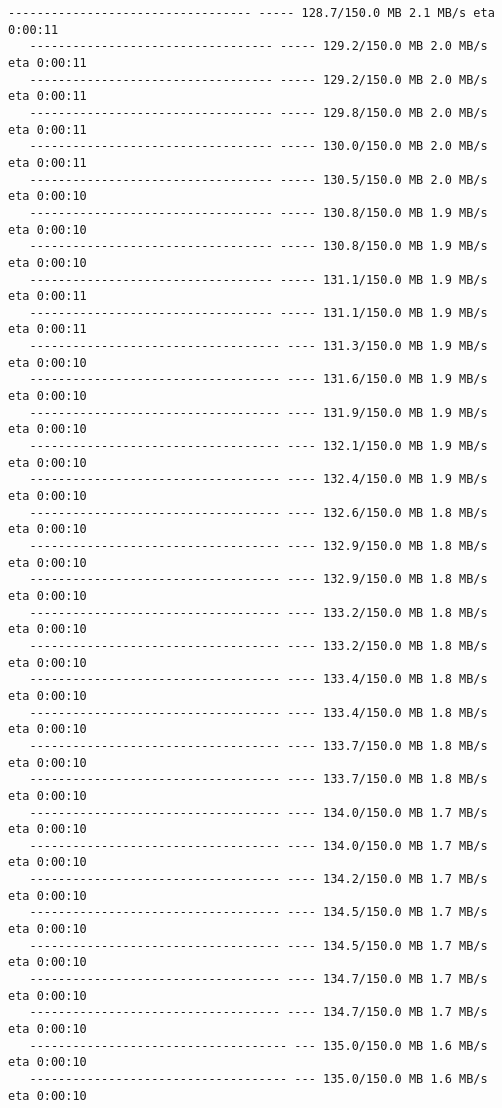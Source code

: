 \documentclass[11pt]{article}
\begin{document}
\begin{Verbatim}[commandchars=\\\{\}]
   ---------------------------------- ----- 128.7/150.0 MB 2.1 MB/s eta 0:00:11
   ---------------------------------- ----- 129.2/150.0 MB 2.0 MB/s eta 0:00:11
   ---------------------------------- ----- 129.2/150.0 MB 2.0 MB/s eta 0:00:11
   ---------------------------------- ----- 129.8/150.0 MB 2.0 MB/s eta 0:00:11
   ---------------------------------- ----- 130.0/150.0 MB 2.0 MB/s eta 0:00:11
   ---------------------------------- ----- 130.5/150.0 MB 2.0 MB/s eta 0:00:10
   ---------------------------------- ----- 130.8/150.0 MB 1.9 MB/s eta 0:00:10
   ---------------------------------- ----- 130.8/150.0 MB 1.9 MB/s eta 0:00:10
   ---------------------------------- ----- 131.1/150.0 MB 1.9 MB/s eta 0:00:11
   ---------------------------------- ----- 131.1/150.0 MB 1.9 MB/s eta 0:00:11
   ----------------------------------- ---- 131.3/150.0 MB 1.9 MB/s eta 0:00:10
   ----------------------------------- ---- 131.6/150.0 MB 1.9 MB/s eta 0:00:10
   ----------------------------------- ---- 131.9/150.0 MB 1.9 MB/s eta 0:00:10
   ----------------------------------- ---- 132.1/150.0 MB 1.9 MB/s eta 0:00:10
   ----------------------------------- ---- 132.4/150.0 MB 1.9 MB/s eta 0:00:10
   ----------------------------------- ---- 132.6/150.0 MB 1.8 MB/s eta 0:00:10
   ----------------------------------- ---- 132.9/150.0 MB 1.8 MB/s eta 0:00:10
   ----------------------------------- ---- 132.9/150.0 MB 1.8 MB/s eta 0:00:10
   ----------------------------------- ---- 133.2/150.0 MB 1.8 MB/s eta 0:00:10
   ----------------------------------- ---- 133.2/150.0 MB 1.8 MB/s eta 0:00:10
   ----------------------------------- ---- 133.4/150.0 MB 1.8 MB/s eta 0:00:10
   ----------------------------------- ---- 133.4/150.0 MB 1.8 MB/s eta 0:00:10
   ----------------------------------- ---- 133.7/150.0 MB 1.8 MB/s eta 0:00:10
   ----------------------------------- ---- 133.7/150.0 MB 1.8 MB/s eta 0:00:10
   ----------------------------------- ---- 134.0/150.0 MB 1.7 MB/s eta 0:00:10
   ----------------------------------- ---- 134.0/150.0 MB 1.7 MB/s eta 0:00:10
   ----------------------------------- ---- 134.2/150.0 MB 1.7 MB/s eta 0:00:10
   ----------------------------------- ---- 134.5/150.0 MB 1.7 MB/s eta 0:00:10
   ----------------------------------- ---- 134.5/150.0 MB 1.7 MB/s eta 0:00:10
   ----------------------------------- ---- 134.7/150.0 MB 1.7 MB/s eta 0:00:10
   ----------------------------------- ---- 134.7/150.0 MB 1.7 MB/s eta 0:00:10
   ------------------------------------ --- 135.0/150.0 MB 1.6 MB/s eta 0:00:10
   ------------------------------------ --- 135.0/150.0 MB 1.6 MB/s eta 0:00:10

\end{Verbatim}
\end{document}
